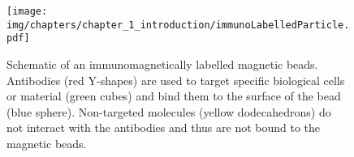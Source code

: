 \begin{figure}[htb]
\centering
\texttt{[image: img/chapters/chapter\_1\_introduction/immunoLabelledParticle.pdf]}
\caption[Magnetic bead labelling via antibodies]{Schematic of an immunomagnetically labelled magnetic beads. Antibodies (red Y-shapes) are used to target specific biological cells or material (green cubes) and bind them to the surface of the bead (blue sphere). Non-targeted molecules (yellow dodecahedrons) do not interact with the antibodies and thus are not bound to the magnetic beads.}
\label{fig:magneticParticleFunctionalized}
\end{figure}

%

